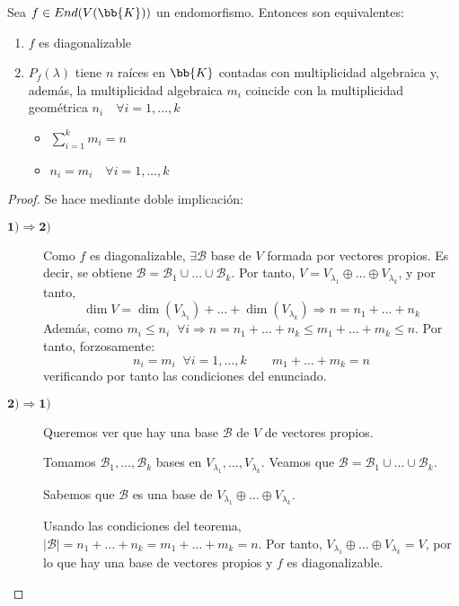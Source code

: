 \begin{teo}
    Sea $f\in End(V(\bb{K}))$ un endomorfismo. Entonces son equivalentes:
    \begin{enumerate}
        \item $f$ es diagonalizable
        
        \item $P_f(\lambda)$ tiene $n$ raíces en $\bb{K}$ contadas con multiplicidad algebraica y, además, la multiplicidad algebraica $m_i$ coincide con la multiplicidad geométrica $n_i \quad \forall i=1,\dots, k$
        \begin{itemize}
            \item $\displaystyle \sum_{i=1}^k m_i = n$
            \item $n_i = m_i \quad \forall i=1,\dots, k$
        \end{itemize}
    \end{enumerate}
\end{teo}
\begin{proof} Se hace mediante doble implicación:
    \begin{description}
        \item [$\mathbf{1) \Longrightarrow 2)}$] Como $f$ es diagonalizable, $\exists \mathcal{B}$ base de $V$ formada por vectores propios. Es decir, se obtiene $\mathcal{B} = \mathcal{B}_1\cup\dots\cup\mathcal{B}_k$. Por tanto, $V = V_{\lambda_1}\oplus\dots\oplus V_{\lambda_k}$, y por tanto,
        $$\dim V = \dim(V_{\lambda_1}) + \dots + \dim(V_{\lambda_k}) \Longrightarrow n = n_1 + \dots + n_k$$
        Además, como $m_i \leq n_i \;\;\forall i \Longrightarrow n = n_1 + \dots  + n_k \leq m_1 + \dots + m_k \leq n$. Por tanto, forzosamente:
        $$n_i = m_i \;\; \forall i = 1,\dots, k \qquad m_1 + \dots + m_k = n$$
        verificando por tanto las condiciones del enunciado.

        
        \item [$\mathbf{2) \Longrightarrow 1)}$]
        Queremos ver que hay una base $\mathcal{B} $ de $V$ de vectores propios.

        Tomamos $\mathcal{B}_1,\dots,\mathcal{B}_k$ bases en $V_{\lambda_1},\dots,V_{\lambda_k}$. Veamos que $\mathcal{B} = \mathcal{B}_1\cup\dots\cup\mathcal{B}_k$.

        Sabemos que $\mathcal{B}$ es una base de $V_{\lambda_1}\oplus\dots\oplus V_{\lambda_k}$. 

        Usando las condiciones del teorema, $|\mathcal{B}| = n_1 + \dots + n_k = m_1 + \dots + m_k = n$. Por tanto, $V_{\lambda_1}\oplus\dots\oplus V_{\lambda_k} = V$, por lo que hay una base de vectores propios y $f$ es diagonalizable.
    \end{description}
\end{proof}

